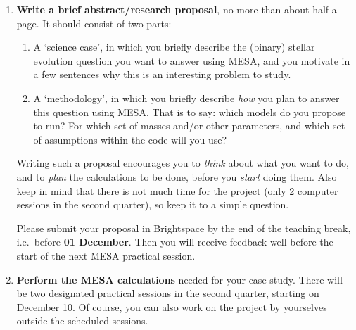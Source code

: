 \begin{enumerate}
\item \textbf{Write a brief abstract/research proposal}, no more than about half a page. It should consist of two parts:
  \begin{enumerate}
  \item A `science case', in which you briefly describe the (binary) stellar evolution question you want to answer using MESA, and you motivate in a few sentences why this is an interesting problem to study.
  \item A `methodology', in which you briefly describe \emph{how} you plan to answer this question using MESA. That is to say: which models do you propose to run? For which set of masses and/or other parameters, and which set of assumptions within the code will you use?
  \end{enumerate}
Writing such a proposal encourages you to \emph{think} about what you want to do, and to \emph{plan} the calculations to be done, before you \emph{start} doing them. Also keep in mind that there is not much time for the project (only 2 computer sessions in the second quarter), so keep it to a simple question.

Please submit your proposal in Brightspace by the end of the teaching break, i.e.\ before \textbf{01 December}. Then you will receive feedback well before the start of the next MESA practical session.

\item \textbf{Perform the MESA calculations} needed for your case study. There will be two designated practical sessions in the second quarter, starting on December 10. Of course, you can also work on the project by yourselves outside the scheduled sessions.


\end{enumerate}
